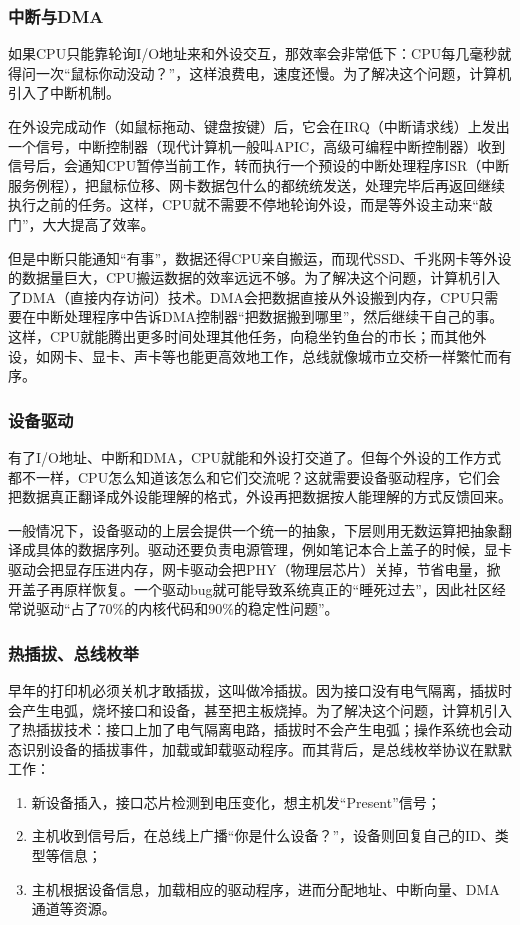 \subsubsection{中断与DMA}

如果CPU只能靠轮询I/O地址来和外设交互，那效率会非常低下：CPU每几毫秒就得问一次“鼠标你动没动？”，这样浪费电，速度还慢。为了解决这个问题，计算机引入了中断机制。

在外设完成动作（如鼠标拖动、键盘按键）后，它会在IRQ（中断请求线）上发出一个信号，中断控制器（现代计算机一般叫APIC，高级可编程中断控制器）收到信号后，会通知CPU暂停当前工作，转而执行一个预设的中断处理程序ISR（中断服务例程），把鼠标位移、网卡数据包什么的都统统发送，处理完毕后再返回继续执行之前的任务。这样，CPU就不需要不停地轮询外设，而是等外设主动来“敲门”，大大提高了效率。

但是中断只能通知“有事”，数据还得CPU亲自搬运，而现代SSD、千兆网卡等外设的数据量巨大，CPU搬运数据的效率远远不够。为了解决这个问题，计算机引入了DMA（直接内存访问）技术。DMA会把数据直接从外设搬到内存，CPU只需要在中断处理程序中告诉DMA控制器“把数据搬到哪里”，然后继续干自己的事。这样，CPU就能腾出更多时间处理其他任务，向稳坐钓鱼台的市长；而其他外设，如网卡、显卡、声卡等也能更高效地工作，总线就像城市立交桥一样繁忙而有序。

\subsubsection{设备驱动}

有了I/O地址、中断和DMA，CPU就能和外设打交道了。但每个外设的工作方式都不一样，CPU怎么知道该怎么和它们交流呢？这就需要设备驱动程序，它们会把数据真正翻译成外设能理解的格式，外设再把数据按人能理解的方式反馈回来。

一般情况下，设备驱动的上层会提供一个统一的抽象，下层则用无数运算把抽象翻译成具体的数据序列。驱动还要负责电源管理，例如笔记本合上盖子的时候，显卡驱动会把显存压进内存，网卡驱动会把PHY（物理层芯片）关掉，节省电量，掀开盖子再原样恢复。一个驱动bug就可能导致系统真正的“睡死过去”，因此社区经常说驱动“占了70\%的内核代码和90\%的稳定性问题”。

\subsubsection{热插拔、总线枚举}

早年的打印机必须关机才敢插拔，这叫做冷插拔。因为接口没有电气隔离，插拔时会产生电弧，烧坏接口和设备，甚至把主板烧掉。为了解决这个问题，计算机引入了热插拔技术：接口上加了电气隔离电路，插拔时不会产生电弧；操作系统也会动态识别设备的插拔事件，加载或卸载驱动程序。而其背后，是总线枚举协议在默默工作：
\begin{enumerate}
  \item 新设备插入，接口芯片检测到电压变化，想主机发“Present”信号；
  \item 主机收到信号后，在总线上广播“你是什么设备？”，设备则回复自己的ID、类型等信息；
  \item 主机根据设备信息，加载相应的驱动程序，进而分配地址、中断向量、DMA通道等资源。
\end{enumerate}


